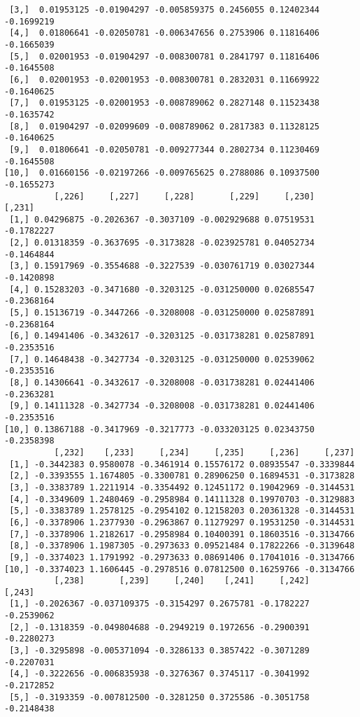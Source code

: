 \documentclass[
  letterpaper,
  DIV=11,
  numbers=noendperiod]{scrreprt}
\begin{document}
\begin{verbatim}
 [3,]  0.01953125 -0.01904297 -0.005859375 0.2456055 0.12402344 -0.1699219
 [4,]  0.01806641 -0.02050781 -0.006347656 0.2753906 0.11816406 -0.1665039
 [5,]  0.02001953 -0.01904297 -0.008300781 0.2841797 0.11816406 -0.1645508
 [6,]  0.02001953 -0.02001953 -0.008300781 0.2832031 0.11669922 -0.1640625
 [7,]  0.01953125 -0.02001953 -0.008789062 0.2827148 0.11523438 -0.1635742
 [8,]  0.01904297 -0.02099609 -0.008789062 0.2817383 0.11328125 -0.1640625
 [9,]  0.01806641 -0.02050781 -0.009277344 0.2802734 0.11230469 -0.1645508
[10,]  0.01660156 -0.02197266 -0.009765625 0.2788086 0.10937500 -0.1655273
          [,226]     [,227]     [,228]       [,229]     [,230]     [,231]
 [1,] 0.04296875 -0.2026367 -0.3037109 -0.002929688 0.07519531 -0.1782227
 [2,] 0.01318359 -0.3637695 -0.3173828 -0.023925781 0.04052734 -0.1464844
 [3,] 0.15917969 -0.3554688 -0.3227539 -0.030761719 0.03027344 -0.1420898
 [4,] 0.15283203 -0.3471680 -0.3203125 -0.031250000 0.02685547 -0.2368164
 [5,] 0.15136719 -0.3447266 -0.3208008 -0.031250000 0.02587891 -0.2368164
 [6,] 0.14941406 -0.3432617 -0.3203125 -0.031738281 0.02587891 -0.2353516
 [7,] 0.14648438 -0.3427734 -0.3203125 -0.031250000 0.02539062 -0.2353516
 [8,] 0.14306641 -0.3432617 -0.3208008 -0.031738281 0.02441406 -0.2363281
 [9,] 0.14111328 -0.3427734 -0.3208008 -0.031738281 0.02441406 -0.2353516
[10,] 0.13867188 -0.3417969 -0.3217773 -0.033203125 0.02343750 -0.2358398
          [,232]    [,233]     [,234]     [,235]     [,236]     [,237]
 [1,] -0.3442383 0.9580078 -0.3461914 0.15576172 0.08935547 -0.3339844
 [2,] -0.3393555 1.1674805 -0.3300781 0.28906250 0.16894531 -0.3173828
 [3,] -0.3383789 1.2211914 -0.3354492 0.12451172 0.19042969 -0.3144531
 [4,] -0.3349609 1.2480469 -0.2958984 0.14111328 0.19970703 -0.3129883
 [5,] -0.3383789 1.2578125 -0.2954102 0.12158203 0.20361328 -0.3144531
 [6,] -0.3378906 1.2377930 -0.2963867 0.11279297 0.19531250 -0.3144531
 [7,] -0.3378906 1.2182617 -0.2958984 0.10400391 0.18603516 -0.3134766
 [8,] -0.3378906 1.1987305 -0.2973633 0.09521484 0.17822266 -0.3139648
 [9,] -0.3374023 1.1791992 -0.2973633 0.08691406 0.17041016 -0.3134766
[10,] -0.3374023 1.1606445 -0.2978516 0.07812500 0.16259766 -0.3134766
          [,238]       [,239]     [,240]    [,241]     [,242]     [,243]
 [1,] -0.2026367 -0.037109375 -0.3154297 0.2675781 -0.1782227 -0.2539062
 [2,] -0.1318359 -0.049804688 -0.2949219 0.1972656 -0.2900391 -0.2280273
 [3,] -0.3295898 -0.005371094 -0.3286133 0.3857422 -0.3071289 -0.2207031
 [4,] -0.3222656 -0.006835938 -0.3276367 0.3745117 -0.3041992 -0.2172852
 [5,] -0.3193359 -0.007812500 -0.3281250 0.3725586 -0.3051758 -0.2148438

\end{verbatim}
\end{document}
